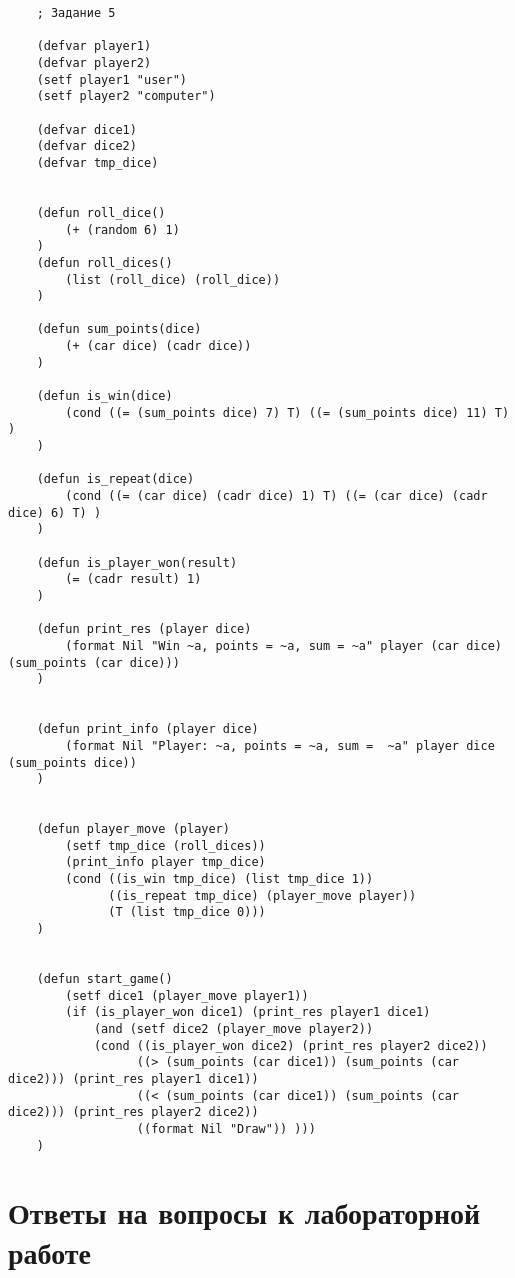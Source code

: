 \begin{lstlisting}
    ; Задание 5

    (defvar player1)
    (defvar player2)
    (setf player1 "user")
    (setf player2 "computer")
    
    (defvar dice1)
    (defvar dice2)
    (defvar tmp_dice)
    
    
    (defun roll_dice() 
        (+ (random 6) 1)
    )
    (defun roll_dices() 
        (list (roll_dice) (roll_dice))
    )
    
    (defun sum_points(dice) 
        (+ (car dice) (cadr dice))
    )
    
    (defun is_win(dice) 
        (cond ((= (sum_points dice) 7) T) ((= (sum_points dice) 11) T) )
    )
    
    (defun is_repeat(dice)
        (cond ((= (car dice) (cadr dice) 1) T) ((= (car dice) (cadr dice) 6) T) )
    )
    
    (defun is_player_won(result) 
        (= (cadr result) 1)
    )
    
    (defun print_res (player dice) 
        (format Nil "Win ~a, points = ~a, sum = ~a" player (car dice) (sum_points (car dice)))
    )
    
    
    (defun print_info (player dice) 
        (format Nil "Player: ~a, points = ~a, sum =  ~a" player dice (sum_points dice))
    )
    
    
    (defun player_move (player)
        (setf tmp_dice (roll_dices))
        (print_info player tmp_dice)
        (cond ((is_win tmp_dice) (list tmp_dice 1))
              ((is_repeat tmp_dice) (player_move player))
              (T (list tmp_dice 0)))
    )
    
    
    (defun start_game()
        (setf dice1 (player_move player1))
        (if (is_player_won dice1) (print_res player1 dice1)
            (and (setf dice2 (player_move player2))
            (cond ((is_player_won dice2) (print_res player2 dice2))
                  ((> (sum_points (car dice1)) (sum_points (car dice2))) (print_res player1 dice1))
                  ((< (sum_points (car dice1)) (sum_points (car dice2))) (print_res player2 dice2)) 
                  ((format Nil "Draw")) )))
    )
\end{lstlisting}





\chapter{Ответы на вопросы к лабораторной работе}

